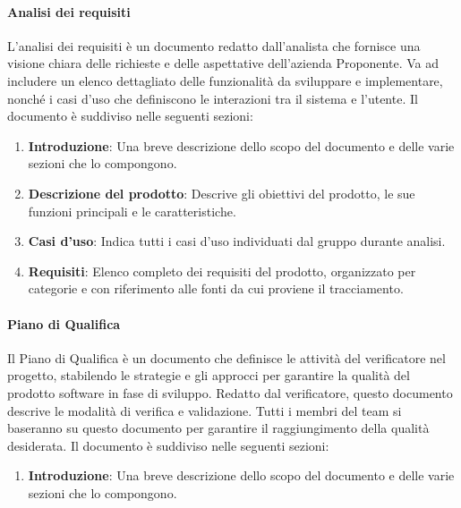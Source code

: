 \paragraph{Analisi dei requisiti}
L’analisi dei requisiti è un documento redatto dall’analista che fornisce una visione chiara delle richieste e delle aspettative dell’azienda Proponente. Va ad includere un elenco dettagliato delle funzionalità da sviluppare e implementare, nonché i casi d’uso che definiscono le interazioni tra il sistema e l’utente.
Il documento è suddiviso nelle seguenti sezioni:
\begin{enumerate}
    \item \textbf{Introduzione}: Una breve descrizione dello scopo del documento e delle varie sezioni che lo compongono.
    \item \textbf{Descrizione del prodotto}: Descrive gli obiettivi del prodotto, le sue funzioni principali e le caratteristiche.
    \item \textbf{Casi d’uso}: Indica tutti i casi d’uso individuati dal gruppo durante analisi.
    \item \textbf{Requisiti}: Elenco completo dei requisiti del prodotto, organizzato per categorie e con riferimento alle fonti da cui proviene il tracciamento.
\end{enumerate}

\paragraph{Piano di Qualifica}
Il Piano di Qualifica è un documento che definisce le attività del verificatore nel progetto, stabilendo le strategie e gli approcci per garantire la qualità del prodotto software in fase di sviluppo. Redatto dal verificatore, questo documento descrive le modalità di verifica e validazione. Tutti i membri del team si baseranno su questo documento per garantire il raggiungimento della qualità desiderata.
Il documento è suddiviso nelle seguenti sezioni: 
\begin{enumerate}
    \item \textbf{Introduzione}: Una breve descrizione dello scopo del documento e delle varie sezioni che lo compongono.
\end{enumerate}

